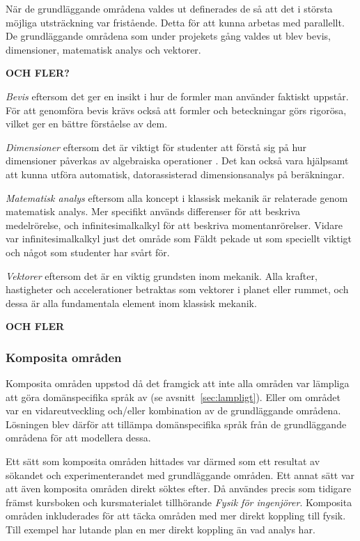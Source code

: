 \begin{binge}
När de grundläggande områdena valdes ut definerades de så att det i största möjliga
utsträckning var fristående. Detta för att kunna arbetas med parallellt. De
grundläggande områdena som under projekets gång valdes ut blev bevis,
dimensioner, matematisk analys och vektorer. 

\textbf{OCH FLER?}

\textit{Bevis} eftersom det ger en insikt i hur de formler man använder
faktiskt uppstår. För att genomföra bevis krävs också att formler och
beteckningar görs rigorösa, vilket ger en bättre förståelse av dem.

\textit{Dimensioner} eftersom det är viktigt för studenter att förstå sig på
hur dimensioner påverkas av algebraiska operationer . Det kan också vara hjälpsamt att kunna utföra automatisk,
datorassisterad dimensionsanalys på beräkningar.

\textit{Matematisk analys} eftersom alla koncept i klassisk mekanik är
relaterade genom matematisk analys. Mer specifikt används differenser för att
beskriva medelrörelse, och infinitesimalkalkyl för att beskriva
momentanrörelser. Vidare var infinitesimalkalkyl just det område som Fäldt
pekade ut som speciellt viktigt och något som studenter har svårt för.

\textit{Vektorer} eftersom det är en viktig grundsten inom mekanik. Alla krafter,
hastigheter och accelerationer betraktas som vektorer i planet eller
rummet, och dessa är alla fundamentala element inom klassisk mekanik.

\textbf{OCH FLER}
  
\subsubsection*{Komposita områden}

Komposita områden uppstod då det framgick att inte alla områden var lämpliga
att göra domänspecifika språk av (se avsnitt~\ref{sec:lampligt}). Eller om
området var en vidareutveckling och/eller kombination av de grundläggande
områdena. Lösningen blev därför att tillämpa domänspecifika språk från de
grundläggande områdena för att modellera dessa.

Ett sätt som komposita områden hittades var därmed som ett resultat av sökandet och
experimenterandet med grundläggande områden. Ett annat sätt var att även
komposita områden direkt söktes efter. Då användes precis som tidigare främst
kursboken och kursmaterialet tillhörande \textit{Fysik för ingenjörer}.
Komposita områden inkluderades för att täcka områden med mer direkt koppling
till fysik. Till exempel har lutande plan en mer direkt koppling än vad analys
har.


\end{binge}
